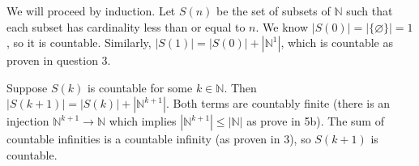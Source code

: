 \documentclass{article}
\begin{document}
We will proceed by induction. Let $S( n)$ be the set of subsets of $\mathbb{N}$ such that each subset has cardinality less than or equal to $n$. We know $|S( 0) |=|\{\varnothing \} |=1$, so it is countable. Similarly, $|S( 1) |=|S( 0) |+|\mathbb{N}^{1} |$, which is countable as proven in question 3.

Suppose $S( k)$ is countable for some $k\in \mathbb{N}$. Then $|S( k+1) |=|S( k) |+|\mathbb{N}^{k+1} |$. Both terms are countably finite (there is an injection $\mathbb{N}^{k+1}\rightarrow \mathbb{N}$ which implies $|\mathbb{N}^{k+1} |\leq |\mathbb{N} |$ as prove in 5b). The sum of countable infinities is a countable infinity (as proven in 3), so $S( k+1)$ is countable. 

\
\hline
\end{document}
